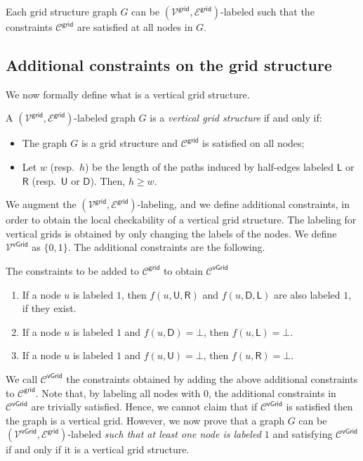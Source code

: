 \documentclass[11pt]{article}
\newcommand{\lleft}{\mathsf {L}}
\newcommand{\lright}{\mathsf {R}}
\newcommand{\lup}{\mathsf {U}}
\newcommand{\ldown}{\mathsf {D}}
\newcommand{\lgrid}{\mathsf {grid}}
\newcommand{\lvgrid}{\mathsf {vGrid}}
\begin{document}
\begin{lemma}\label{lem:grid2}
	Each grid structure graph $G$ can be $(\mathcal{V^\lgrid},\mathcal{E^\lgrid})$-labeled such that the constraints $\mathcal{C}^{\lgrid}$ are satisfied at all nodes in $G$. 
\end{lemma}

\subsection{Additional constraints on the grid structure}
We now formally define what is a vertical grid structure.
\begin{definition}
	A $(\mathcal{V^\lgrid},\mathcal{E^\lgrid})$-labeled graph $G$ is a \emph{vertical grid structure} if and only if:
	\begin{itemize}[noitemsep]
		\item The graph $G$ is a grid structure and $\mathcal{C}^{\lgrid}$ is satisfied on all nodes;
		\item Let $w$ (resp.\ $h$) be the length of the paths induced by half-edges labeled $\lleft$ or $\lright$ (resp.\ $\lup$ or $\ldown$). Then, $h \ge w$.
	\end{itemize}
\end{definition}
We augment the $(\mathcal{V^\lgrid},\mathcal{E^\lgrid})$-labeling, and we define additional constraints, in order to obtain the local checkability of a vertical grid structure. The labeling for vertical grids is obtained by only changing the labels of the nodes. We define $\mathcal{V}^{\lvgrid}$ as $\{0,1\}$. The additional constraints are the following.
\begin{myframe}{The constraints to be added to $\mathcal{C}^{\lgrid}$ to obtain $\mathcal{C}^{\lvgrid}$}
\begin{enumerate}
	\item If a node $u$ is labeled $1$, then $f(u,\lup,\lright)$ and $f(u,\ldown,\lleft)$ are also labeled $1$, if they exist. \label{constr:diagonal}
	\item If a node $u$ is labeled $1$ and $f(u,\ldown) = \bot$, then $f(u,\lleft) = \bot$. \label{constr:vert1}
	\item If a node $u$ is labeled $1$ and $f(u,\lup) = \bot$, then $f(u,\lright) = \bot$.  \label{constr:vert2}
\end{enumerate}
\end{myframe}
\noindent We call $\mathcal{C}^{\lvgrid}$ the constraints obtained by adding the above additional constraints to  $\mathcal{C}^{\lgrid}$.
Note that, by labeling all nodes with $0$, the additional constraints in $\mathcal{C}^{\lvgrid}$ are trivially satisfied. Hence, we cannot claim that if $\mathcal{C}^{\lvgrid}$  is satisfied then the graph is a vertical grid. However, we now prove that a graph $G$ can be $(\mathcal{V^\lvgrid},\mathcal{E^\lgrid})$-labeled \emph{such that at least one node is labeled $1$} and satisfying $\mathcal{C}^{\lvgrid}$ if and only if it is a vertical grid structure.
\end{document}
